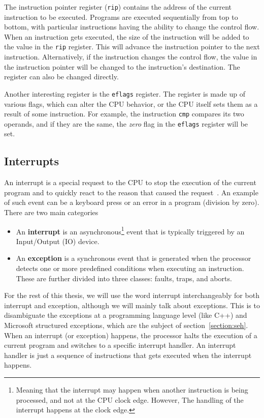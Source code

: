 The instruction pointer register (\texttt{rip}) contains the address of the
current instruction to be executed. Programs are executed sequentially from top
to bottom, with particular instructions having the ability to change the
control flow. When an instruction gets executed, the size of the instruction
will be added to the value in the \texttt{rip} register. This will advance the
instruction pointer to the next instruction. Alternatively, if the instruction
changes the control flow, the value in the instruction pointer will be changed
to the instruction's destination. The register can also be changed directly.

Another interesting register is the \texttt{eflags} register. The register is
made up of various flags, which can alter the CPU behavior, or the CPU itself
sets them as a result of some instruction. For example, the instruction
\texttt{cmp} compares its two operands, and if they are the same, the
\textit{zero} flag in the \texttt{eflags} register will be set.

\subsection{Interrupts}\label{section:interrupts}
An interrupt is a special request to the CPU to stop the execution of the
current program and to quickly react to the reason that caused the
request~\cite{computer-architecture}. An example of such event can be a
keyboard press or an error in a program (division by zero). There are two main
categories~\cite{intel-manual}
\begin{itemize}
    \item An \textbf{interrupt} is an asynchronous\footnote{Meaning that the
        interrupt may happen when another instruction is being processed, and
        not at the CPU clock edge. However, The handling of the interrupt
        happens at the clock edge.} event that is typically triggered by an
        Input/Output (IO) device.
    \item An \textbf{exception} is a synchronous event that is
        generated when the processor detects one or more predefined conditions
        when executing an instruction. These are further divided into three
        classes: faults, traps, and aborts.
\end{itemize}


For the rest of this thesis, we will use the word interrupt interchangeably for
both interrupt and exception, although we will mainly talk about exceptions.
This is to disambiguate the exceptions at a programming language level (like
C++) and Microsoft structured exceptions, which are the subject of
section~\ref{section:seh}. When an interrupt (or exception) happens, the
processor halts the execution of a current program and switches to a specific
interrupt handler. An interrupt handler is just a sequence of instructions that
gets executed when the interrupt happens. 

